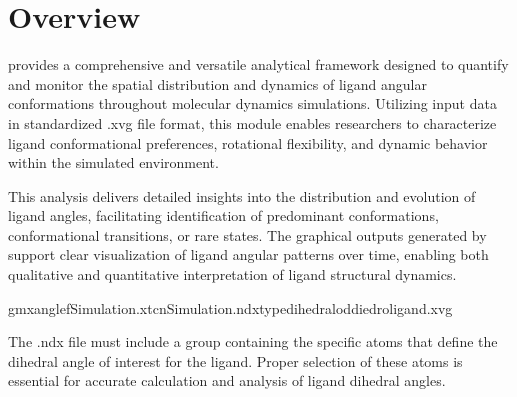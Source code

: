 \documentclass[a4paper,10pt,english]{sphinxmanual}
\begin{document}
\section{Overview}
\label{\detokenize{Ligand angle:overview}}
\sphinxAtStartPar
{} provides a comprehensive and versatile analytical framework designed to quantify and monitor the spatial distribution and dynamics of ligand angular conformations throughout molecular dynamics simulations. Utilizing input data in standardized .xvg file format, this module enables researchers to characterize ligand conformational preferences, rotational flexibility, and dynamic behavior within the simulated environment.

\sphinxAtStartPar
This analysis delivers detailed insights into the distribution and evolution of ligand angles, facilitating identification of predominant conformations, conformational transitions, or rare states. The graphical outputs generated by  support clear visualization of ligand angular patterns over time, enabling both qualitative and quantitative interpretation of ligand structural dynamics.

\sphinxAtStartPar
{}

\begin{sphinxVerbatim}[commandchars=\\\{\}]
gmxangle\PYGZhy{}fSimulation.xtc\PYGZhy{}nSimulation.ndx\PYGZhy{}typedihedral\PYGZhy{}oddiedro\PYGZus{}ligand.xvg
\end{sphinxVerbatim}

\sphinxAtStartPar
{} The .ndx file must include a group containing the specific atoms that define the dihedral angle of interest for the ligand. Proper selection of these atoms is essential for accurate calculation and analysis of ligand dihedral angles.

\begin{sphinxVerbatim}[commandchars=\\\{\}]
    
\end{sphinxVerbatim}
\end{document}
